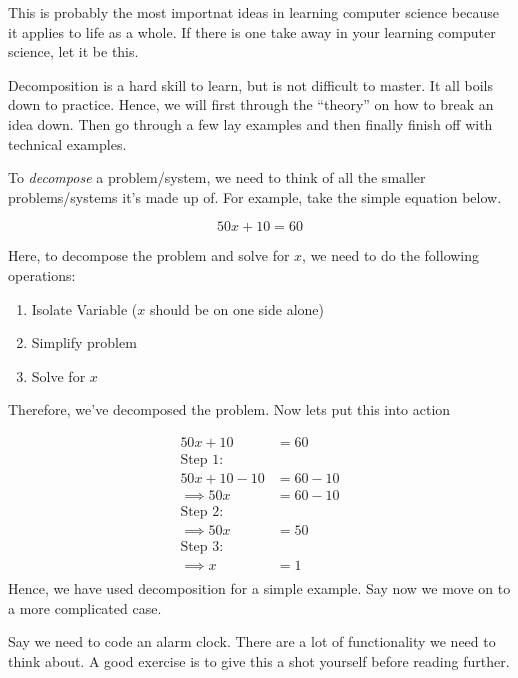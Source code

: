 \documentclass[12pt,a4paper]{book}
\begin{document}
			This is probably the most importnat ideas in learning computer science because it applies to life as a whole. If there is one take away in your learning computer science, let it be this.
			
			Decomposition is a hard skill to learn, but is not difficult to master. It all boils down to practice. Hence, we will first through the ``theory'' on how to break an idea down. Then go through a few lay examples and then finally finish off with technical examples.
			
			To \textit{decompose} a problem/system, we need to think of all the smaller problems/systems it's made up of. For example, take the simple equation below.

			\begin{equation*}
				50x + 10 = 60
			\end{equation*}

			Here, to decompose the problem and solve for $x$, we need to do the following operations:

			\begin{enumerate}
				\item Isolate Variable ($x$ should be on one side alone)
				\item Simplify problem
				\item Solve for $x$
			\end{enumerate}
			
			Therefore, we've decomposed the problem. Now lets put this into action

			\begin{align*}
				50x + 10 &= 60 \\
				\text{Step 1}:& \\
				50x + 10 - 10 &= 60 - 10 \\
				\implies 50x &= 60 - 10 \\
				\text{Step 2}:& \\
				\implies 50x &= 50 \\
				\text{Step 3}:& \\
				\implies x &= 1 \\
			\end{align*}
			Hence, we have used decomposition for a simple example. Say now we move on to a more complicated case. 
			
			Say we need to code an alarm clock. There are a lot of functionality we need to think about. A good exercise is to give this a shot yourself before reading further. 
\end{document}
